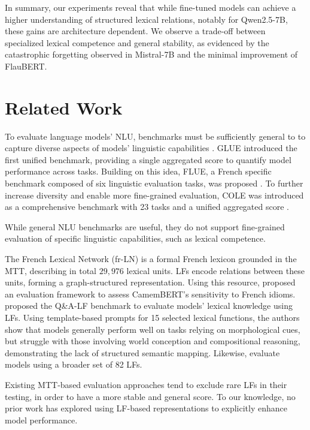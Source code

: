 \documentclass[11pt]{article}
\begin{document}
In summary, our experiments reveal that while fine-tuned models can achieve a higher understanding of structured lexical relations, notably for Qwen2.5-7B, these gains are architecture dependent. We observe a trade-off between specialized lexical competence and general stability, as evidenced by the catastrophic forgetting observed in Mistral-7B and the minimal improvement of FlauBERT.

\section{Related Work}\label{sec:relwork}
To evaluate language models' NLU, benchmarks must be sufficiently general to to capture diverse aspects of models' linguistic capabilities
\citep{niSurveyLargeLanguage2025}. GLUE \cite{niSurveyLargeLanguage2025}
introduced the first unified benchmark, providing a single aggregated score to quantify
model performance across tasks. Building on this idea,
FLUE, a French specific benchmark composed of six linguistic evaluation tasks,
was proposed \citep{leFlauBERTUnsupervisedLanguage2020}. To further increase diversity and enable more fine-grained evaluation, COLE was
introduced as a comprehensive benchmark with 23 tasks and a unified aggregated
score \citep{beaucheminCOLEComprehensiveBenchmark2025}. 

While general NLU benchmarks are useful, they do not support fine-grained
evaluation of specific linguistic capabilities, such as lexical competence.

The French Lexical Network (fr-LN) \citep{11403/lexical-system-fr/v3.2} is a
formal French lexicon grounded in the MTT, describing in total $29,976$ lexical
units. LFs encode relations between these units,
forming a graph-structured representation. Using this resource,
\citet{liuAssessingBERTsSensitivity2024} proposed 
an evaluation framework to assess CamemBERT's \cite{martin-etal-2020-camembert}
sensitivity to French idioms. \citet{petrovQALFFrenchQuestionAnswering2025}
proposed the Q\&A-LF benchmark to evaluate models' lexical knowledge using
LFs. Using template-based prompts for 15 selected lexical functions,
the authors show that models generally perform well on tasks relying on
morphological cues, but struggle with those involving world conception and
compositional reasoning, demonstrating the lack of structured semantic
mapping. Likewise, \citet{liEvaluationCompetenceLexicale2025} evaluate models using a broader set of 82 LFs. 

Existing MTT-based evaluation approaches tend to exclude rare LFs in their
testing, in order to have a more stable and general score. To our knowledge, no prior work
has explored using LF-based representations to explicitly enhance model performance.
\end{document}
